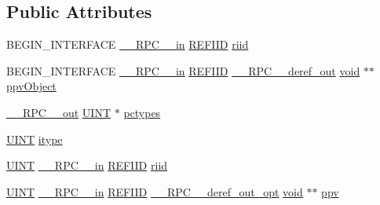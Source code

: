 \subsection*{Public Attributes}
\begin{DoxyCompactItemize}
\item 
B\+E\+G\+I\+N\+\_\+\+I\+N\+T\+E\+R\+F\+A\+CE \hyperlink{rpcsal_8h_a20b7f6da600a05c8b541659f14f7f0e6}{\+\_\+\+\_\+\+R\+P\+C\+\_\+\+\_\+in} \hyperlink{px__win__ds_8c_a80ec49c8ae61e234197d5071d2df497d}{R\+E\+F\+I\+ID} \hyperlink{struct_i_property_enum_type_list_vtbl_a9502e4c8a151042f7a08a6179a2477db}{riid}
\item 
B\+E\+G\+I\+N\+\_\+\+I\+N\+T\+E\+R\+F\+A\+CE \hyperlink{rpcsal_8h_a20b7f6da600a05c8b541659f14f7f0e6}{\+\_\+\+\_\+\+R\+P\+C\+\_\+\+\_\+in} \hyperlink{px__win__ds_8c_a80ec49c8ae61e234197d5071d2df497d}{R\+E\+F\+I\+ID} \hyperlink{rpcsal_8h_a23bc188526f10656f9c79d950f6c3192}{\+\_\+\+\_\+\+R\+P\+C\+\_\+\+\_\+deref\+\_\+out} \hyperlink{sound_8c_ae35f5844602719cf66324f4de2a658b3}{void} $\ast$$\ast$ \hyperlink{struct_i_property_enum_type_list_vtbl_a97963cb303e7d172301cbb2b8f65dfaf}{ppv\+Object}
\item 
\hyperlink{rpcsal_8h_aa518a2c78d44d75f3685c32c455c5ed8}{\+\_\+\+\_\+\+R\+P\+C\+\_\+\+\_\+out} \hyperlink{mapinls_8h_a36cb3b01d81ffd844bbbfb54003e06ec}{U\+I\+NT} $\ast$ \hyperlink{struct_i_property_enum_type_list_vtbl_a089fa6269a6ef7b0a120f1b889911e6c}{pctypes}
\item 
\hyperlink{mapinls_8h_a36cb3b01d81ffd844bbbfb54003e06ec}{U\+I\+NT} \hyperlink{struct_i_property_enum_type_list_vtbl_a4284c47b696fe94fccdfc89c09d224ae}{itype}
\item 
\hyperlink{mapinls_8h_a36cb3b01d81ffd844bbbfb54003e06ec}{U\+I\+NT} \hyperlink{rpcsal_8h_a20b7f6da600a05c8b541659f14f7f0e6}{\+\_\+\+\_\+\+R\+P\+C\+\_\+\+\_\+in} \hyperlink{px__win__ds_8c_a80ec49c8ae61e234197d5071d2df497d}{R\+E\+F\+I\+ID} \hyperlink{struct_i_property_enum_type_list_vtbl_a9502e4c8a151042f7a08a6179a2477db}{riid}
\item 
\hyperlink{mapinls_8h_a36cb3b01d81ffd844bbbfb54003e06ec}{U\+I\+NT} \hyperlink{rpcsal_8h_a20b7f6da600a05c8b541659f14f7f0e6}{\+\_\+\+\_\+\+R\+P\+C\+\_\+\+\_\+in} \hyperlink{px__win__ds_8c_a80ec49c8ae61e234197d5071d2df497d}{R\+E\+F\+I\+ID} \hyperlink{rpcsal_8h_ab29e89ceb0eb0b075c6f6299b0de6a21}{\+\_\+\+\_\+\+R\+P\+C\+\_\+\+\_\+deref\+\_\+out\+\_\+opt} \hyperlink{sound_8c_ae35f5844602719cf66324f4de2a658b3}{void} $\ast$$\ast$ \hyperlink{struct_i_property_enum_type_list_vtbl_a294805df488e9cc36fa56fde22de27a1}{ppv}
\item 

\end{DoxyCompactItemize}
